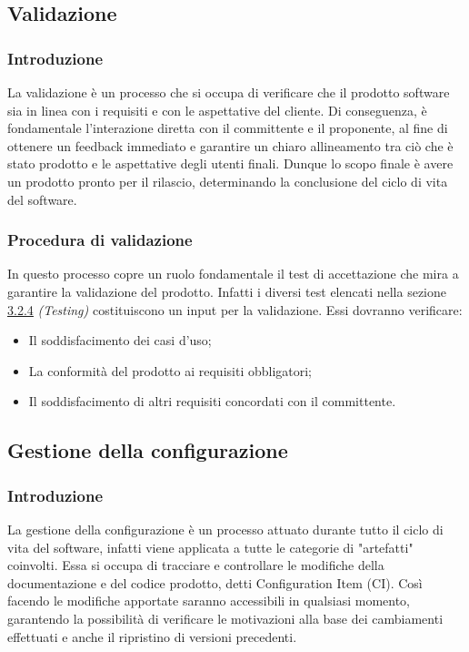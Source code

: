 \subsection{Validazione}
\subsubsection{Introduzione}
La validazione è un processo che si occupa di verificare che il prodotto software sia in linea con i requisiti
e con le aspettative del cliente. Di conseguenza, è fondamentale l'interazione diretta con il committente e il
proponente, al fine di ottenere un feedback immediato e garantire un chiaro allineamento tra ciò che è stato
prodotto e le aspettative degli utenti finali. Dunque lo scopo finale è avere un prodotto pronto per il rilascio, determinando la
conclusione del ciclo di vita del software.

\subsubsection{Procedura di validazione}
In questo processo copre un ruolo fondamentale il test di accettazione che mira a garantire la validazione
del prodotto. Infatti i diversi test elencati nella sezione \href{#testing}{\underline{3.2.4}} \textit{(Testing)} costituiscono un input
per la validazione. Essi dovranno verificare:
\begin{itemize}
	\item Il soddisfacimento dei casi d'uso;
	\item La conformità del prodotto ai requisiti obbligatori;
	\item Il soddisfacimento di altri requisiti concordati con il committente.
\end{itemize}

\subsection{Gestione della configurazione}
\subsubsection{Introduzione}
La gestione della configurazione è un processo attuato durante tutto il ciclo di vita del software, infatti viene
applicata a tutte le categorie di "artefatti" coinvolti. Essa si occupa di tracciare e controllare le modifiche della documentazione e del codice
prodotto, detti Configuration Item (CI). Così facendo le modifiche apportate saranno accessibili in qualsiasi momento, garantendo la
possibilità di verificare le motivazioni alla base dei cambiamenti effettuati e anche il ripristino di versioni precedenti.

